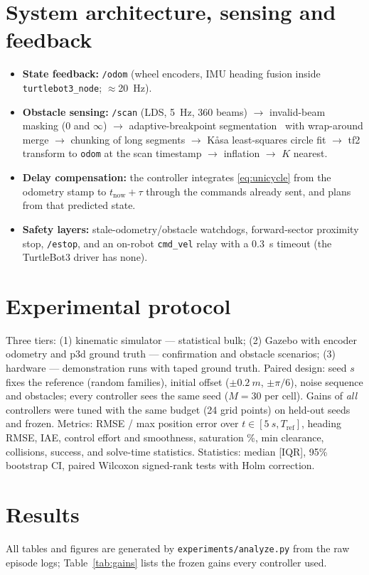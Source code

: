 \documentclass[11pt,a4paper]{article}
\begin{document}
\section{System architecture, sensing and feedback}
\begin{itemize}
\item \textbf{State feedback:} \texttt{/odom} (wheel encoders, IMU heading fusion inside \texttt{turtlebot3\_node}; $\approx$\SI{20}{Hz}).
\item \textbf{Obstacle sensing:} \texttt{/scan} (LDS, \SI{5}{Hz}, 360 beams) $\to$ invalid-beam masking (0 and $\infty$) $\to$ adaptive-breakpoint segmentation~\cite{borges2004} with wrap-around merge $\to$ chunking of long segments $\to$ K\aa sa least-squares circle fit $\to$ tf2 transform to \texttt{odom} at the scan timestamp $\to$ inflation $\to$ $K$ nearest.
\item \textbf{Delay compensation:} the controller integrates \eqref{eq:unicycle} from the odometry stamp to $t_{\text{now}}+\tau$ through the commands already sent, and plans from that predicted state.
\item \textbf{Safety layers:} stale-odometry/obstacle watchdogs, forward-sector proximity stop, \texttt{/estop}, and an on-robot \texttt{cmd\_vel} relay with a \SI{0.3}{s} timeout (the TurtleBot3 driver has none).
\end{itemize}

\section{Experimental protocol}
Three tiers: (1) kinematic simulator --- statistical bulk; (2) Gazebo with encoder odometry and p3d ground truth --- confirmation and obstacle scenarios; (3) hardware --- demonstration runs with taped ground truth. Paired design: seed $s$ fixes the reference (random families), initial offset ($\pm\SI{0.2}{m}$, $\pm\pi/6$), noise sequence and obstacles; every controller sees the same seed ($M=30$ per cell). Gains of \emph{all} controllers were tuned with the same budget (24 grid points) on held-out seeds and frozen. Metrics: RMSE / max position error over $t\in[\SI{5}{s},T_{\text{ref}}]$, heading RMSE, IAE, control effort and smoothness, saturation \%, min clearance, collisions, success, and solve-time statistics. Statistics: median [IQR], 95\% bootstrap CI, paired Wilcoxon signed-rank tests with Holm correction.

\section{Results}
All tables and figures are generated by \texttt{experiments/analyze.py} from the raw episode logs; Table~\ref{tab:gains} lists the frozen gains every controller used.

\end{document}
